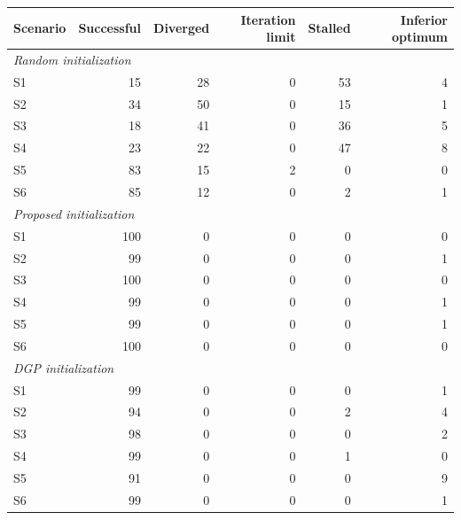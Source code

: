 \begin{tabular}{lrrrrr}
\toprule
Scenario & Successful & Diverged & Iteration limit & Stalled & Inferior optimum \\
\midrule
\multicolumn{6}{l}{\textit{Random initialization}} \\
S1 & 15 & 28 & 0 & 53 & 4 \\
S2 & 34 & 50 & 0 & 15 & 1 \\
S3 & 18 & 41 & 0 & 36 & 5 \\
S4 & 23 & 22 & 0 & 47 & 8 \\
S5 & 83 & 15 & 2 & 0 & 0 \\
S6 & 85 & 12 & 0 & 2 & 1 \\
\midrule
\multicolumn{6}{l}{\textit{Proposed initialization}} \\
S1 & 100 & 0 & 0 & 0 & 0 \\
S2 & 99 & 0 & 0 & 0 & 1 \\
S3 & 100 & 0 & 0 & 0 & 0 \\
S4 & 99 & 0 & 0 & 0 & 1 \\
S5 & 99 & 0 & 0 & 0 & 1 \\
S6 & 100 & 0 & 0 & 0 & 0 \\
\midrule
\multicolumn{6}{l}{\textit{DGP initialization}} \\
S1 & 99 & 0 & 0 & 0 & 1 \\
S2 & 94 & 0 & 0 & 2 & 4 \\
S3 & 98 & 0 & 0 & 0 & 2 \\
S4 & 99 & 0 & 0 & 1 & 0 \\
S5 & 91 & 0 & 0 & 0 & 9 \\
S6 & 99 & 0 & 0 & 0 & 1 \\
\bottomrule
\end{tabular}
